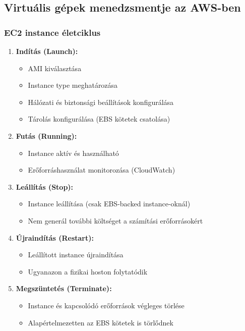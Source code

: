 \documentclass[a4paper,12pt]{article}
\begin{document}
    \subsection{Virtuális gépek menedzsmentje az AWS-ben}

    \subsubsection{EC2 instance életciklus}

    \begin{enumerate}
        \item \textbf{Indítás (Launch):}
        \begin{itemize}
            \item AMI kiválasztása
            \item Instance type meghatározása
            \item Hálózati és biztonsági beállítások konfigurálása
            \item Tárolás konfigurálása (EBS kötetek csatolása)
        \end{itemize}

        \item \textbf{Futás (Running):}
        \begin{itemize}
            \item Instance aktív és használható
            \item Erőforráshasználat monitorozása (CloudWatch)
        \end{itemize}

        \item \textbf{Leállítás (Stop):}
        \begin{itemize}
            \item Instance leállítása (csak EBS-backed instance-oknál)
            \item Nem generál további költséget a számítási erőforrásokért
        \end{itemize}

        \item \textbf{Újraindítás (Restart):}
        \begin{itemize}
            \item Leállított instance újraindítása
            \item Ugyanazon a fizikai hoston folytatódik
        \end{itemize}

        \item \textbf{Megszüntetés (Terminate):}
        \begin{itemize}
            \item Instance és kapcsolódó erőforrások végleges törlése
            \item Alapértelmezetten az EBS kötetek is törlődnek
        \end{itemize}
    \end{enumerate}
\end{document}
